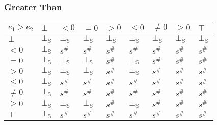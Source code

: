 \documentclass{beamer}
\begin{document}
                \begin{frame}
                    \frametitle{Greater Than}
                \begin{table}
                    \begin{tabular}{|l|l|l|l|l|l|l|l|l|}
                    \hline
                    $e_1 > e_2$ & $\bot$ & $<0$   & $=0$   & $>0$   & $\le 0$ & $\ne 0$ & $\ge 0$ & $\top$ \\ \hline
                    $\bot$      & $\bot_\mathbb{S}$ & $\bot_\mathbb{S}$ & $\bot_\mathbb{S}$ & $\bot_\mathbb{S}$ & $\bot_\mathbb{S}$  & $\bot_\mathbb{S}$  & $\bot_\mathbb{S}$  & $\bot_\mathbb{S}$ \\ \hline
                    $<0$        & $\bot_\mathbb{S}$ & $s^\#$ & $s^\#$ & $s^\#$ & $s^\#$  & $s^\#$  & $s^\#$  & $s^\#$ \\ \hline
                    $=0$        & $\bot_\mathbb{S}$ & $\bot_\mathbb{S}$ & $\bot_\mathbb{S}$ & $s^\#$ & $\bot_\mathbb{S}$  & $s^\#$  & $s^\#$  & $s^\#$ \\ \hline
                    $>0$        & $\bot_\mathbb{S}$ & $\bot_\mathbb{S}$ & $\bot_\mathbb{S}$ & $s^\#$ & $\bot_\mathbb{S}$  & $s^\#$  & $s^\#$  & $s^\#$ \\ \hline
                    $\le 0$     & $\bot_\mathbb{S}$ & $s^\#$ & $s^\#$ & $s^\#$ & $s^\#$  & $s^\#$  & $s^\#$  & $s^\#$ \\ \hline
                    $\ne 0$     & $\bot_\mathbb{S}$ & $s^\#$ & $s^\#$ & $s^\#$ & $s^\#$  & $s^\#$  & $s^\#$  & $s^\#$ \\ \hline
                    $\ge 0$     & $\bot_\mathbb{S}$ & $\bot_\mathbb{S}$ & $\bot_\mathbb{S}$ & $s^\#$ & $\bot_\mathbb{S}$  & $s^\#$  & $s^\#$  & $s^\#$ \\ \hline
                    $\top$      & $\bot_\mathbb{S}$ & $s^\#$ & $s^\#$ & $s^\#$ & $s^\#$  & $s^\#$  & $s^\#$  & $s^\#$ \\ \hline
                    \end{tabular}
                    \end{table}
                \end{frame}
\end{document}
